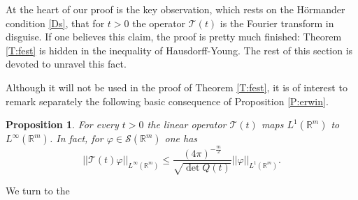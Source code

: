 \documentclass[11pt,a4paper]{amsart}
\def \vf{\varphi}
\newcommand{\Rm}{\mathbb R^m}
\numberwithin{equation}{section}
\newtheorem{proposition}[theorem]{Proposition}
\numberwithin{equation}{section}
\begin{document}
At  the heart of our proof is the key observation, which rests on the H\"ormander condition \eqref{Ds}, that for $t>0$ the operator $\mathcal T(t)$ is the Fourier transform in disguise.
If one believes this claim, the proof is pretty much finished: Theorem \ref{T:fest} is hidden in the inequality of Hausdorff-Young. The rest of this section is devoted to unravel this fact.
 
Although it will not be used in the proof of Theorem \ref{T:fest}, it is of interest to remark separately the following basic consequence of Proposition \ref{P:erwin}.

\begin{proposition}\label{P:TtL1infty}
For every $t>0$ the linear operator $\mathcal T(t)$ maps $L^1(\Rm)$ to $L^\infty(\Rm)$. In fact, for $\vf\in \mathscr S(\Rm)$ one has
\begin{equation}\label{1infty} 
||\mathcal T(t) \vf||_{L^\infty(\Rm)} \le  \frac{(4\pi 
)^{-\frac{m}{2}}}{\sqrt{\det Q(t)}} ||\vf||_{L^1(\Rm)}.
\end{equation}
\end{proposition}

We turn to the
  
\end{document}
